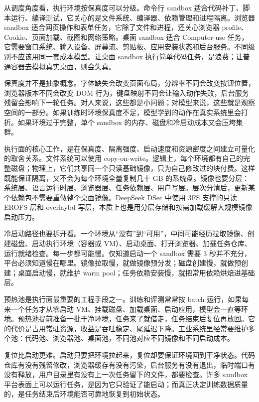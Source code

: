 从调度角度看，执行环境按保真度可以分级。命令行 sandbox 适合代码补丁、脚本运行、编译测试，它关心的是文件系统、编译器、依赖管理和进程隔离。浏览器 sandbox 适合网页操作和表单任务，它除了文件和进程，还关心浏览器 profile、Cookie、页面加载、截图和网络策略。桌面 sandbox 适合 Computer-use 任务，它需要窗口系统、输入设备、屏幕流、剪贴板、应用安装状态和后台服务。不同级别不应该用同一套成本模型。让桌面 sandbox 执行简单代码任务，是浪费；让普通容器去模拟真实桌面，则会失真。

保真度并不是抽象概念。字体缺失会改变页面布局，分辨率不同会改变按钮位置，浏览器版本不同会改变 DOM 行为，键盘映射不同会让输入动作失败，后台服务残留会影响下一轮任务。对人来说，这些都是小问题；对模型来说，这些就是观察空间的一部分。如果训练时环境保真度不足，模型学到的动作在真实系统里会打折。如果环境过于完整，单个 sandbox 的内存、磁盘和冷启动成本又会压垮集群。

执行面的核心工作，是在保真度、隔离强度、启动速度和资源密度之间建立可量化的取舍关系。文件系统可以使用 copy-on-write。逻辑上，每个环境都有自己的完整磁盘；物理上，它们共享同一个只读基础镜像，只为自己修改过的块付费。这样既能保证隔离，又不会为每个环境全量复制几十 GB 的系统盘。镜像也要分层：系统层、语言运行时层、浏览器层、任务依赖层、用户写层。层次分清后，更新某个依赖包不需要重做整个桌面镜像。DeepSeek DSec 中使用 3FS 支撑的只读 EROFS 层和 overlaybd 写层，本质上也是用分层存储和按需加载缓解大规模镜像启动压力。

冷启动路径也要拆开看。一个环境从“没有”到“可用”，中间可能经历拉取镜像、创建磁盘、启动执行环境（容器或 VM）、启动桌面、打开浏览器、加载任务仓库、运行就绪检查。每一步都可能慢。仅知道启动一个 sandbox 需要 3 秒并不充分，平台必须知道慢在哪里。镜像拉取慢，就做镜像预分发；磁盘创建慢，就做预创建；桌面启动慢，就维护 warm pool；任务依赖安装慢，就把常用依赖烘焙进基础层。

预热池是执行面最重要的工程手段之一。训练和评测常常按 batch 运行，如果每来一个任务才从零启动 VM、挂载磁盘、加载桌面、启动应用，模型会一直等环境。预热池提前准备一批干净环境，任务来了就借走，任务结束后复位再放回。它的代价是占用常驻资源，收益是吞吐稳定、尾延迟下降。工业系统里经常要维护多个池：代码池、浏览器池、桌面池，不同池对应不同镜像和不同启动成本。

复位比启动更难。启动只要把环境拉起来，复位却要保证环境回到干净状态。代码仓库有没有残留修改，浏览器缓存有没有污染，后台服务有没有退出，临时端口有没有释放，用户目录里有没有上一次任务留下的文件，都要检查。许多 sandbox 平台表面上可以运行任务，是因为它只验证了能启动；而真正决定训练数据质量的，是任务结束后环境能否可靠地恢复到初始状态。

